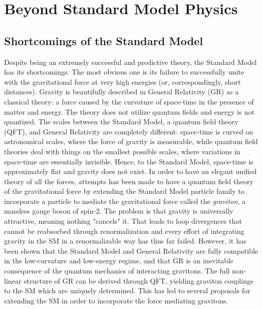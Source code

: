 \clearpage
\chapter{Beyond Standard Model Physics}
\section{Shortcomings of the Standard Model}
Despite being an extremely successful and predictive theory, the Standard Model has its shortcomings. The most obvious one is its failure to successfully unite with the gravitational force at very high energies (or, correspondingly, short distances). Gravity is beautifully described in General Relativity (GR) as a classical theory: a force caused by the curvature of space-time in the presence of matter and energy. The theory does not utilize quantum fields and energy is not quantized.
The scales between the Standard Model, a quantum field theory (QFT), and General Relativity are completely different: space-time is curved on astronomical scales, where the force of gravity is measurable, while quantum field theories deal with things on the smallest possible scales, where variations in space-time are essentially invisible. Hence, to the Standard Model, space-time is approximately flat and gravity does not exist. In order to have an elegant unified theory of all the forces, attempts has been made to have a quantum field theory of the gravitational force by extending the Standard Model particle family to incorporate a particle to mediate the gravitational force called the \emph{graviton}, a massless gauge boson of spin-2. The problem is that gravity is universally attractive, meaning nothing "cancels" it. That leads to loop divergences that cannot be reabsorbed through renormalization and every effort of integrating gravity in the SM in a renormalizable way has thus far failed. 
However, it has been shown that the Standard Model and General Relativity are fully compatible in the low-curvature and low-energy regime, and that GR is an inevitable consequence of the quantum mechanics of interacting gravitons. The full non-linear structure of GR can be derived through QFT, yielding graviton couplings to the SM which are uniquely determined. This has led to several proposals for extending the SM in order to incorporate the force mediating gravitons. \newline
